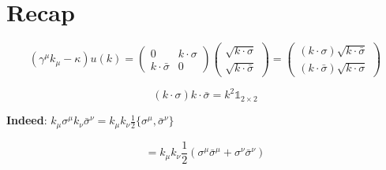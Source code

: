 \documentclass[11pt]{article}
\author{}
\title{}
\date{}
\begin{document}
	\pagestyle{fancy}
	\maketitle
	
	\vspace{-8em}
	
 	
	\noindent
	
	\vspace{11pt}
	
	
	\section*{Recap}
	
	\[ (\gamma^\mu k_\mu - \kappa) u(k) =  \begin{pmatrix} 0 & k\cdot \sigma \\ k\cdot \bar{\sigma} & 0 \end{pmatrix} \begin{pmatrix}
		\sqrt{k\cdot \sigma} \\ \sqrt{k \cdot \bar{\sigma}}
	\end{pmatrix} = \begin{pmatrix}
		(k \cdot \sigma ) \sqrt{k \cdot \bar{\sigma}} \\ (k\cdot \bar{\sigma})\sqrt{k\cdot \sigma}
\end{pmatrix} \]
	
	
	
	\[ (k\cdot \sigma) k\cdot \bar{\sigma}  = k^2 \mathbb{1}_{2\times2}\]
	
	\textbf{Indeed}: $k_\mu \sigma^\mu k_\nu \bar{\sigma}^\nu = k_\mu k_\nu \frac{1}{2}\{\sigma^\mu, \bar{{\sigma}}^\nu \}$
	
	$$ = k_\mu k_\nu \frac{1}{2} (\sigma^\mu \bar{{\sigma}}^\mu + \sigma^\nu \bar{\sigma}^\nu )$$
	
\end{document}
